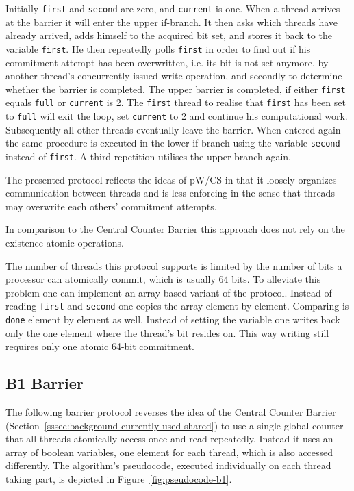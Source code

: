 \documentclass[a4paper, 10pt]{article}
\begin{document}
Initially \texttt{first} and \texttt{second} are zero, and \texttt{current} is one. When a thread arrives at the barrier it will enter the upper if-branch. It then asks which threads have already arrived, adds himself to the acquired bit set, and stores it back to the variable \texttt{first}.
He then repeatedly polls \texttt{first} in order to find out if his commitment attempt has been overwritten, i.e. its bit is not set anymore, by another thread's concurrently issued write operation, and secondly to determine whether the barrier is completed. The upper barrier is completed, if either \texttt{first} equals \texttt{full} or \texttt{current} is 2. The \texttt{first} thread to realise that \texttt{first} has been set to \texttt{full} will exit the loop, set \texttt{current} to 2 and continue his computational work. Subsequently all other threads eventually leave the barrier.
When entered again the same procedure is executed in the lower if-branch using the variable \texttt{second} instead of \texttt{first}. A third repetition utilises the upper branch again.

The presented protocol reflects the ideas of pW/CS in that it loosely organizes communication between threads and is less enforcing in the sense that threads may overwrite each others' commitment attempts.

In comparison to the Central Counter Barrier this approach does not rely on the existence atomic operations.

The number of threads this protocol supports is limited by the number of bits a processor can atomically commit, which is usually 64 bits. To alleviate this problem one can implement an array-based variant of the protocol. Instead of reading \texttt{first} and \texttt{second} one copies the array element by element. Comparing is \texttt{done} element by element as well. Instead of setting the variable one writes back only the one element where the thread's bit resides on. This way writing still requires only one atomic 64-bit commitment.

\subsection{B1 Barrier}
\label{ssec:new-b1}

The following barrier protocol reverses the idea of the Central Counter Barrier (Section~\ref{sssec:background-currently-used-shared}) to use a single global counter that all threads atomically access once and read repeatedly. Instead it uses an array of boolean variables, one element for each thread, which is also accessed differently.
The algorithm's pseudocode, executed individually on each thread taking part, is depicted in Figure~\ref{fig:pseudocode-b1}.
\end{document}
